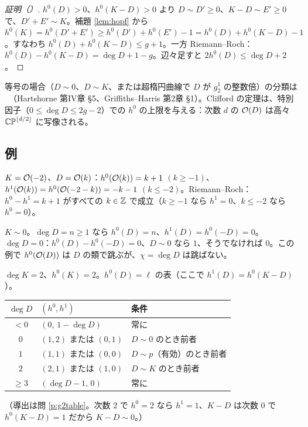 \begin{proof}[証明（\tP）]
$h^0(D)>0$、$h^0(K-D)>0$ より $D\sim D'\ge0$、$K-D\sim E'\ge0$ で、$D'+E'\sim K$。補題 \ref{lem:hopf} から $h^0(K)=h^0(D'+E')\ge h^0(D')+h^0(E')-1=h^0(D)+h^0(K-D)-1$。すなわち $h^0(D)+h^0(K-D)\le g+1$。一方 Riemann--Roch：$h^0(D)-h^0(K-D)=\deg D+1-g$。辺々足すと $2h^0(D)\le\deg D+2$。 
\end{proof}
等号の場合（$D\sim0$、$D\sim K$、または超楕円曲線で $D$ が $g^1_2$ の整数倍）の分類は \tC\ （Hartshorne 第IV章 §5\tQ、Griffiths--Harris 第2章 §1\tQ）。Clifford の定理は、特別因子（$0\le\deg D\le2g-2$）での $h^0$ の上限を与える：次数 $d$ の $\mathcal O(D)$ は高々 $\mathbb{CP}^{\lfloor d/2\rfloor}$ に写像される。

\subsection{例}
\begin{ex}[$\CP^1$、$g=0$]
$K=\mathcal O(-2)$、$D=\mathcal O(k)$：$h^0(\mathcal O(k))=k+1$ $(k\ge-1)$、$h^1(\mathcal O(k))=h^0(\mathcal O(-2-k))=-k-1$ $(k\le-2)$。Riemann--Roch：$h^0-h^1=k+1$ がすべての $k\in\mathbb Z$ で成立（$k\ge-1$ なら $h^1=0$、$k\le-2$ なら $h^0=0$）。
\end{ex}
\begin{ex}[楕円曲線、$g=1$]\label{ex:ellRR}
$K\sim0$。$\deg D=n\ge1$ なら $h^0(D)=n$、$h^1(D)=h^0(-D)=0$。$\deg D=0$：$h^0(D)-h^0(-D)=0$、$D\sim0$ なら $1$、そうでなければ $0$。この例で $h^0(\mathcal O(D))$ は $D$ の類で跳ぶが、$\chi=\deg D$ は跳ばない。
\end{ex}
\begin{ex}[$g=2$：表]\label{ex:g2}
$\deg K=2$、$h^0(K)=2$。$h^0(D)=\ell$ の表（ここで $h^1(D)=h^0(K-D)$）。
\begin{center}
\begin{tabular}{c|l|l}
\toprule
$\deg D$ & $(h^0,h^1)$ & 条件\\
\midrule
$<0$ & $(0,\,1-\deg D)$ & 常に\\
$0$ & $(1,2)$ または $(0,1)$ & $D\sim0$ のとき前者\\
$1$ & $(1,1)$ または $(0,0)$ & $D\sim p$（有効）のとき前者\\
$2$ & $(2,1)$ または $(1,0)$ & $D\sim K$ のとき前者\\
$\ge3$ & $(\deg D-1,\,0)$ & 常に\\
\bottomrule
\end{tabular}
\end{center}
（導出は問 \ref{p:g2table}。次数 $2$ で $h^0=2$ なら $h^1=1$、$K-D$ は次数 $0$ で $h^0(K-D)=1$ だから $K-D\sim0$。）
\end{ex}
